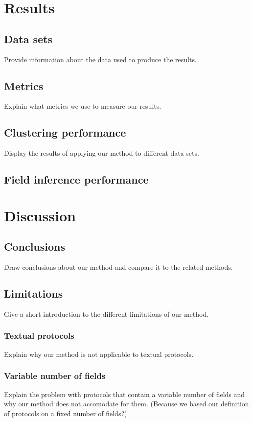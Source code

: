 \documentclass[a4paper]{report}
\begin{document}
\chapter{Results}

\section{Data sets}
Provide information about the data used to produce the results.

\section{Metrics}
Explain what metrics we use to measure our results.

\section{Clustering performance}
Display the results of applying our method to different data sets.

\section{Field inference performance}

\chapter{Discussion}

\section{Conclusions}
Draw conclusions about our method and compare it to the related methods.

\section{Limitations}
Give a short introduction to the different limitations of our method.

\subsection{Textual protocols}
Explain why our method is not applicable to textual protocols.

\subsection{Variable number of fields}
Explain the problem with protocols that contain a variable number of fields and
why our method does not accomodate for them. (Because we based our definition
of protocols on a fixed number of fields?)
\end{document}
